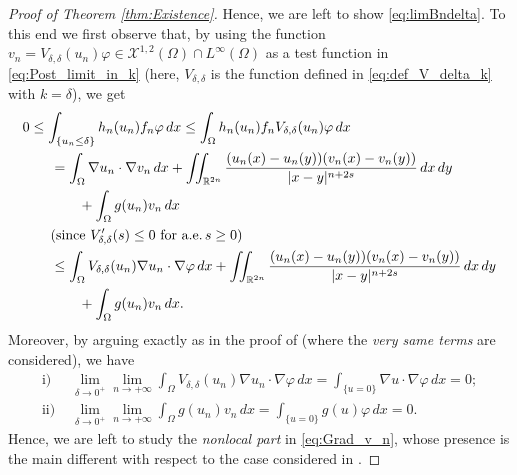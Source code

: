 \documentclass[11pt,a4paper]{amsart}
\def \R {\mathbb{R}}
\theoremstyle{definition}
\theoremstyle{plain}
\numberwithin{equation}{section}
\begin{document}
{\begin{proof}[Proof of Theorem \ref{thm:Existence}]
Hence, we are left to show \eqref{eq:limBndelta}. To this end
we first observe that, by using the function $v_n = V_{\delta,\delta}(u_n)\varphi\in\mathcal{X}^{1,2}(\Omega)
\cap L^\infty(\Omega)$ as
a test function in \eqref{eq:Post_limit_in_k} (here, $V_{\delta,\delta}$ is the
function defined in \eqref{eq:def_V_delta_k} with $k = \delta$), we get
\begin{equation}\label{eq:Grad_v_n}
\begin{split}
&
0 \leq \int_{\{u_n \leq \delta\}} h_n(u_n)f_n \varphi\,dx \leq \int_{\Omega}h_n(u_n)f_n V_{\delta,\delta}
(u_n)\varphi\,dx \\
& \qquad
 = \int_{\Omega}\nabla u_n\cdot \nabla v_n\,dx
 + \iint_{\R^{2n}}\dfrac{(u_n(x)-u_n(y))(v_n(x)-v_n(y))}{|x-y|^{n+2s}}\,dx\,dy
 \\
 & \qquad\qquad
 +\int_{\Omega}g(u_n)v_n\,dx \\
 & \qquad (\text{since $V'_{\delta,\delta}(s)\leq 0$ for a.e.\,$s\geq 0$}) \\
 & \qquad
 \leq \int_{\Omega}V_{\delta,\delta}(u_n)\nabla u_n\cdot \nabla\varphi\,dx
 + \iint_{\R^{2n}}\dfrac{(u_n(x)-u_n(y))(v_n(x)-v_n(y))}{|x-y|^{n+2s}}\,dx\,dy
 \\
 & \qquad\qquad
 +\int_{\Omega}g(u_n)v_n\,dx.
 \end{split}
\end{equation}
Moreover, by arguing exactly as in the proof of \cite[Theorem 3.4]{Oliva}
(where the \emph{very same terms} are considered), we have
\begin{equation} \label{eq:convergenzedaOliva}
 \begin{split}
  \mathrm{i)}&\,\,\lim_{\delta\to 0^+}\lim_{n\to+\infty}
  \int_{\Omega}V_{\delta,\delta}(u_n)\nabla u_n\cdot \nabla\varphi\,dx
  = \int_{\{u = 0\}}\nabla u\cdot\nabla\varphi\,dx = 0;
  \\
   \mathrm{ii)}&\,\,\lim_{\delta\to 0^+}\lim_{n\to+\infty}\int_{\Omega}g(u_n)v_n\,dx
   = \int_{\{u = 0\}}g(u)\varphi\,dx = 0.
 \end{split}
\end{equation}
Hence, we are left to study the \emph{nonlocal part} in \eqref{eq:Grad_v_n}, whose presence is
the main different with respect to the case considered in \cite{Oliva}.
\vspace*{0.1cm}


\end{proof}}
\end{document}
